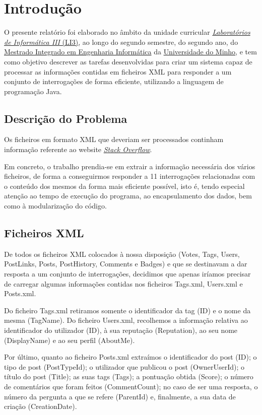\documentclass[a4paper]{article}
\begin{document}
\tableofcontents


\pagebreak

\section{Introdução}
\label{sec:intro}

O presente relatório foi elaborado no âmbito da unidade curricular
\href{http://miei.di.uminho.pt/plano_estudos.html#laborat_rios_de_inform_tica_iii}
{\emph {Laboratórios de Informática III} (LI3)}, ao longo do segundo semestre,
do segundo ano, do \href{http://miei.di.uminho.pt}{Mestrado Integrado em Engenharia Informática}
da \href{https://www.uminho.pt}{Universidade do Minho}, e tem como objetivo
descrever as tarefas desenvolvidas para criar um sistema capaz de processar as
informações contidas em ficheiros XML para responder a um conjunto de
interrogações de forma eficiente, utilizando a linguagem de programação Java.


\subsection{Descrição do Problema}
\label{sec:problema}

Os ficheiros em formato XML que deveriam ser processados continham informação referente ao
website \href{https://stackoverflow.com/}{\textit{Stack Overflow}}.

Em concreto, o trabalho prendia-se em extrair a informação necessária dos vários
ficheiros, de forma a conseguirmos responder a 11 interrogações relacionadas com
o conteúdo dos mesmos da forma mais eficiente possível, isto é, tendo especial
atenção ao tempo de execução do programa, ao encapsulamento dos dados, bem como
à modularização do código.

\subsection{Ficheiros XML}
\label{sec:xml}

De todos os ficheiros XML colocados à nossa disposição (Votes, Tags, Users,
PostLinks, Posts, PostHistory, Comments e Badges) e que se destinavam a dar resposta
a um conjunto de interrogações, decidimos que apenas iríamos precisar de carregar
algumas informações contidas nos ficheiros Tags.xml, Users.xml e Posts.xml. \par
Do ficheiro Tags.xml retiramos somente o identificador da tag (ID) e o nome da mesma
(TagName). Do ficheiro Users.xml, recolhemos a informação relativa ao identificador
do utilizador (ID), à sua reputação (Reputation), ao seu nome (DisplayName) e ao seu
perfil (AboutMe). \par
Por último, quanto ao ficheiro Posts.xml extraímos o identificador
do post (ID); o tipo de post (PostTypeId); o utilizador que publicou o post
(OwnerUserId); o título do post (Title); as suas tags (Tags); a pontuação obtida
(Score); o número de comentários que foram feitos (CommentCount); no caso de
ser uma resposta, o número da pergunta a que se refere (ParentId) e, finalmente,
a sua data de criação (CreationDate).
\end{document}
